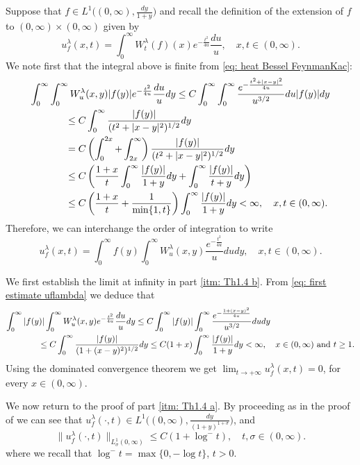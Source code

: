 \documentclass[a4paper,10pt, reqno]{amsart}
\theoremstyle{definition}
\theoremstyle{remark}
\numberwithin{equation}{section}
\begin{document}
Suppose that $f\in L^1\big((0,\infty),\frac{dy}{1+y}\big)$ and recall the definition of the extension of $f$ to $(0,\infty)\times (0,\infty)$ given by
\[
u_f^\lambda (x,t)=\int_0^\infty W_t^\lambda (f)(x)e^{-\frac{t^2}{4u}}\frac{du}{u},\quad x,t\in (0,\infty).
\]
We note first that the integral above is finite from \eqref{eq: heat Bessel FeynmanKac}:
\begin{align}
\int_0^\infty \int_0^\infty W_u^\lambda (x,y)|f(y)|e^{-\frac{t^2}{4u}}\frac{du}{u}dy&\leq C\int_0^\infty \int_0^\infty \frac{e^{-\frac{t^2+|x-y|^2}{4u}}}{u^{3/2}}du|f(y)|dy\nonumber\\
&\hspace{-4cm}\leq C\int_0^\infty \frac{|f(y)|}{(t^2+|x-y|^2)^{1/2}}dy \label{eq: uflambda poisson}\\
&\hspace{-4cm}= C\left(\int_0^{2x}+\int_{2x}^\infty\right)\frac{|f(y)|}{(t^2+|x-y|^2)^{1/2}}dy\nonumber\\
&\hspace{-4cm}\leq C\left(\frac{1+x}{t}\int_0^\infty \frac{|f(y)|}{1+y}dy+\int_0^\infty \frac{|f(y)|}{t+y}dy\right)\nonumber\\
&\hspace{-4cm}\leq C\left(\frac{1+x}{t}+\frac{1}{\min\{1,t\}}\right)\int_0^\infty \frac{|f(y)|}
{1+y}dy<\infty,\quad x,t\in (0,\infty). \label{eq: first estimate uflambda}
\end{align}
Therefore, we can interchange the order of integration to write
\[
u_f^\lambda (x,t)=\int_0^\infty f(y)\int_0^\infty W_u^\lambda (x,y)\frac{e^{-\frac{t^2}{4u}}}{u}dudy,\quad x,t\in (0,\infty).
\]

We first establish the limit at infinity in part \ref{itm: Th1.4 b}. From \eqref{eq: first estimate uflambda} we deduce that
\begin{align*}
\int_0^\infty |f(y)|\int_0^\infty W_u^\lambda (x,y)e^{-\frac{t^2}{4u}}\frac{du}{u}dy&\leq C\int_0^\infty |f(y)|\int_0^\infty \frac{e^{-\frac{1+(x-y)^2}{4u}}}{u^{3/2}}dudy\\
&\hspace{-4cm}\leq C\int_0^\infty \frac{|f(y)|}{(1+(x-y)^2)^{1/2}}dy\leq C(1+x)\int_0^\infty \frac{|f(y)|}{1+y}dy<\infty ,\quad x\in (0,\infty)\mbox{ and }t\geq 1.
\end{align*}
Using the dominated convergence theorem we get $\lim_{t\rightarrow +\infty}u_f^\lambda (x,t)=0$, for every $x\in (0,\infty)$. 

We now return to the proof of part \ref{itm: Th1.4 a}. 
By proceeding as in the proof of \cite[Lemma 3.2]{ChHW} we can see that $u_f^\lambda (\cdot, t)\in L^1\big((0,\infty),\frac{dy}{(1+y)^{1+\sigma}}\big)$, and 
\[
\|u_f^\lambda (\cdot ,t)\|_{L^1_\sigma(0,\infty)}\leq C(1+\log^{-}t),\quad t,\sigma \in (0,\infty).
\]
where we recall that $\log^-t=\max\{0,-\log t\}$, $t>0$. 
\end{document}
